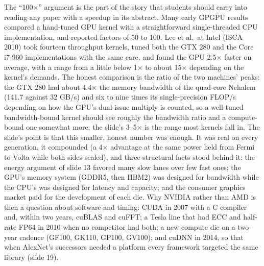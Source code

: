 \documentclass[11pt,letterpaper]{article}
\begin{document}
The ``100$\times$'' argument is the part of the story that students should carry into reading any paper with a speedup in its abstract. Many early GPGPU results compared a hand-tuned GPU kernel with a straightforward single-threaded CPU implementation, and reported factors of 50 to 100. Lee et al.\ at Intel (ISCA 2010) took fourteen throughput kernels, tuned both the GTX 280 and the Core i7-960 implementations with the same care, and found the GPU 2.5$\times$ faster on average, with a range from a little below 1$\times$ to about 15$\times$ depending on the kernel's demands. The honest comparison is the ratio of the two machines' peaks: the GTX 280 had about 4.4$\times$ the memory bandwidth of the quad-core Nehalem (141.7 against 32 GB/s) and six to nine times its single-precision FLOP/s depending on how the GPU's dual-issue multiply is counted, so a well-tuned bandwidth-bound kernel should see roughly the bandwidth ratio and a compute-bound one somewhat more; the slide's 3--5$\times$ is the range most kernels fall in. The slide's point is that this smaller, honest number was enough. It was real on every generation, it compounded (a 4$\times$ advantage at the same power held from Fermi to Volta while both sides scaled), and three structural facts stood behind it: the energy argument of slide 13 favored many slow lanes over few fast ones; the GPU's memory system (GDDR5, then HBM2) was designed for bandwidth while the CPU's was designed for latency and capacity; and the consumer graphics market paid for the development of each die. Why NVIDIA rather than AMD is then a question about software and timing: CUDA in 2007 with a C compiler and, within two years, cuBLAS and cuFFT; a Tesla line that had ECC and half-rate FP64 in 2010 when no competitor had both; a new compute die on a two-year cadence (GF100, GK110, GP100, GV100); and cuDNN in 2014, so that when AlexNet's successors needed a platform every framework targeted the same library (slide 19).
\end{document}
